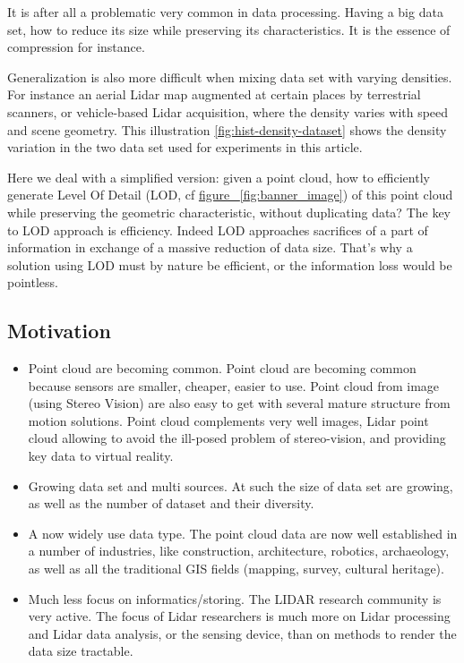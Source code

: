 		It is after all a problematic very common in data processing. Having a big data set, how to reduce its size while preserving its characteristics.
		It is the essence of compression for instance.
		
		Generalization is also more difficult when mixing data set with varying densities. For instance an aerial Lidar map augmented at certain places by terrestrial scanners, or vehicle-based Lidar acquisition, where the density varies with speed and scene geometry.
		This illustration \ref{fig:hist-density-dataset} shows the density variation in the two data set used for experiments in this article.
		
		Here we deal with a simplified version: given a point cloud, how to efficiently generate Level Of Detail (LOD, cf \href{banner_image}{figure ~\ref{fig:banner_image}}) of this point cloud while preserving the geometric characteristic, without duplicating data?
		The key to LOD approach is efficiency. Indeed LOD approaches sacrifices of a part of information in exchange of a massive reduction of data size. That's why a solution using LOD must by nature be efficient, or the information loss would be pointless.
		
	\subsection{Motivation}
		\begin{itemize}
			\item Point cloud are becoming common. 
				Point cloud are becoming common because sensors are smaller, cheaper, easier to use. Point cloud from image (using Stereo Vision) are also easy to get with several mature structure from motion solutions.
				Point cloud complements very well images, Lidar point cloud allowing to avoid the ill-posed problem of stereo-vision, and providing key data to virtual reality.
			\item Growing data set and multi sources.
				At such the size of data set are growing, as well as the number of dataset and their diversity.
			\item A now widely use data type.
				The point cloud data are now well established in a number of industries, like construction, architecture, robotics, archaeology, as well as all the traditional GIS fields (mapping, survey, cultural heritage).
			\item Much less focus on informatics/storing.
				The LIDAR research community is very active. The focus of Lidar researchers is much more on Lidar processing and Lidar data analysis, or the sensing device, than on methods to render the data size tractable. 
		\end{itemize}   
		
